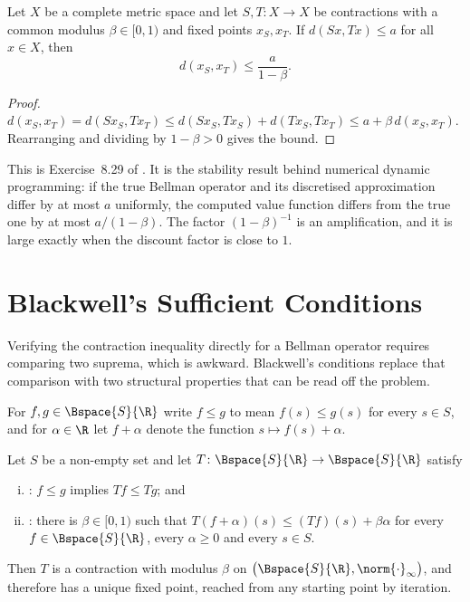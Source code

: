\begin{proposition}\label{prop:fixed-point-comparison}
	Let $X$ be a complete metric space and let $S,T\colon X\to X$ be contractions
	with a common modulus $\beta\in[0,1)$ and fixed points $x_S,x_T$. If
	$d(Sx,Tx)\leq a$ for all $x\in X$, then
	\[
		d(x_S,x_T)\leq\frac{a}{1-\beta}.
	\]
\end{proposition}

\begin{proof}
	$d(x_S,x_T)=d(Sx_S,Tx_T)\leq d(Sx_S,Tx_S)+d(Tx_S,Tx_T)
		\leq a+\beta\,d(x_S,x_T)$. Rearranging and dividing by $1-\beta>0$ gives the
	bound.
\end{proof}

This is Exercise~8.29 of \textcite[p.~290]{fukuda2026notes}. It is the
stability result behind numerical dynamic programming: if the true Bellman
operator and its discretised approximation differ by at most $a$ uniformly, the
computed value function differs from the true one by at most $a/(1-\beta)$.
The factor $(1-\beta)^{-1}$ is an amplification, and it is large exactly when
the discount factor is close to $1$.

\section{Blackwell's Sufficient Conditions}\label{sec:comp-blackwell}

Verifying the contraction inequality directly for a Bellman operator requires
comparing two suprema, which is awkward. Blackwell's conditions replace that
comparison with two structural properties that can be read off the problem.

For $f,g\in\Bspace{S}{\R}$ write $f\leq g$ to mean $f(s)\leq g(s)$ for every
$s\in S$, and for $\alpha\in\R$ let $f+\alpha$ denote the function
$s\mapsto f(s)+\alpha$.

\begin{theorem}[Blackwell]\label{thm:blackwell}
	Let $S$ be a non-empty set and let $T\colon\Bspace{S}{\R}\to\Bspace{S}{\R}$
	satisfy
	\begin{enumerate}[(i)]
		\item {}: $f\leq g$ implies
		      $Tf\leq Tg$; and
		\item {}: there is
		      $\beta\in[0,1)$ such that
		      $T(f+\alpha)(s)\leq (Tf)(s)+\beta\alpha$ for every
		      $f\in\Bspace{S}{\R}$, every $\alpha\geq0$ and every $s\in S$.
	\end{enumerate}
	Then $T$ is a contraction with modulus $\beta$ on
	$\bigl(\Bspace{S}{\R},\norm{\cdot}_\infty\bigr)$, and therefore has a unique
	fixed point, reached from any starting point by iteration.
\end{theorem}

